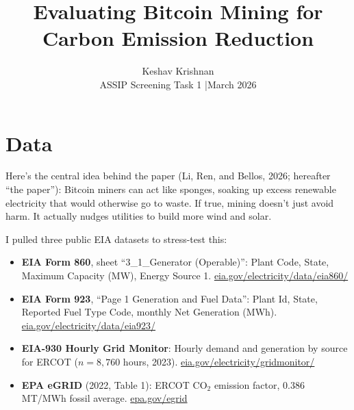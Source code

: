 \documentclass[11pt, letterpaper]{article}
\title{\vspace{-1.5cm}\textbf{Evaluating Bitcoin Mining for\\Carbon Emission Reduction}}
\author{Keshav Krishnan\\\small ASSIP Screening Task 1 \quad|\quad March 2026}
\date{}
\begin{document}
\maketitle
\vspace{-0.4cm}

\noindent{}

\vspace{6pt}

\section{Data}

Here's the central idea behind the paper (Li, Ren, and Bellos, 2026; hereafter ``the paper''): Bitcoin miners can act like sponges, soaking up excess renewable electricity that would otherwise go to waste. If true, mining doesn't just avoid harm. It actually nudges utilities to build more wind and solar.

I pulled three public EIA datasets to stress-test this:

\begin{itemize}
\item \textbf{EIA Form 860}, sheet ``3\_1\_Generator (Operable)'': Plant Code, State, Maximum Capacity (MW), Energy Source 1.
\href{https://www.eia.gov/electricity/data/eia860/}{eia.gov/electricity/data/eia860/}
\item \textbf{EIA Form 923}, ``Page 1 Generation and Fuel Data'': Plant Id, State, Reported Fuel Type Code, monthly Net Generation (MWh).
\href{https://www.eia.gov/electricity/data/eia923/}{eia.gov/electricity/data/eia923/}
\item \textbf{EIA-930 Hourly Grid Monitor}: Hourly demand and generation by source for ERCOT ($n = 8{,}760$ hours, 2023). \href{https://www.eia.gov/electricity/gridmonitor/}{eia.gov/electricity/gridmonitor/}
\item \textbf{EPA eGRID} (2022, Table 1): ERCOT CO$_2$ emission factor, 0.386 MT/MWh fossil average.
\href{https://www.epa.gov/egrid}{epa.gov/egrid}
\end{itemize}
\end{document}
